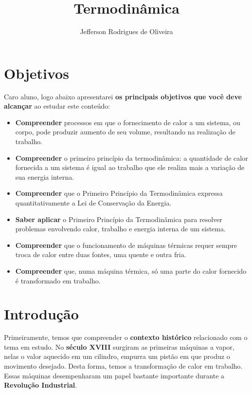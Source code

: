 \documentclass[12pt]{article}
\title{Termodinâmica}
\author{Jefferson Rodrigues de Oliveira}
\date{}
\begin{document}
\maketitle
\tableofcontents
\hypertarget{x-objetivos}{\section{Objetivos}}
Caro aluno, logo abaixo apresentarei \textbf{os principais objetivos que você deve alcançar} ao estudar este conteúdo:


\begin{itemize}

\item \textbf{Compreender} processos em que o fornecimento de calor a um sistema, ou corpo, pode produzir aumento de seu volume, resultando na realização de trabalho.

\item \textbf{Compreender} o primeiro princípio da termodinâmica: a quantidade de calor fornecida a um sistema é igual ao trabalho que ele realiza mais a variação de sua energia interna.

\item \textbf{Compreender} que o Primeiro Princípio da Termodinâmica expressa quantitativamente a Lei de Conservação da Energia.

\item \textbf{Saber aplicar} o Primeiro Princípio da Termodinâmica para resolver problemas envolvendo calor, trabalho e energia interna de um sistema.

\item \textbf{Compreender} que o funcionamento de máquinas térmicas requer sempre troca de calor entre duas fontes, uma quente e outra fria.

\item \textbf{Compreender} que, numa máquina térmica, só uma parte do calor fornecido é transformado em trabalho.

\end{itemize}


\hypertarget{x-introdução}{\section{Introdução}}
Primeiramente, temos que compreender o \textbf{contexto histórico} relacionado com o tema em estudo. No \textbf{século XVIII} surgiram as primeiras máquinas a vapor, nelas o valor aquecido em um cilindro, empurra um pistão em que produz o movimento desejado. Desta forma, temos a transformação de calor em trabalho. Essas máquinas desempenharam um papel bastante importante durante a \textbf{Revolução Industrial}.
\end{document}
